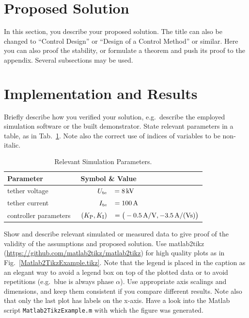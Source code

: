 \documentclass[journal]{IEEEtran}
\newcounter{assumption}
\renewcommand{\t}[1]{\text{\normalfont{#1}}} %
\begin{document}
\section{Proposed Solution}

In this section, you describe your proposed solution. The title can also be changed to “Control Design” or “Design of a Control Method” or similar. Here you can also proof the stability, or formulate a theorem and push its proof to the appendix. Several subsections may be used.


\section{Implementation and Results}

Briefly describe how you verified your solution, e.g.\ describe the employed simulation software or the built demonstrator. State relevant parameters in a table, as in Tab.~\ref{SimulationParameters}. Note also the correct use of indices of variables to be non-italic.

\begin{table}[h!]
		\setlength{\tabcolsep}{1pt}
		\centering
		\caption{Relevant Simulation Parameters.}
		\label{SimulationParameters}
		\begin{tabular}{lrl}
				\\\hline
								\textbf{Parameter}
						&
								\multicolumn{2}{l}{\textbf{Symbol \& Value}}
				\\\hline
								tether voltage
						&
								$U_\t{te}$
						&
								$= \unit[8]{kV}$
				\\
								tether current
						&
								$I_\t{te}$
						&
								$= \unit[100]{A}$
				\\
								controller parameters \,
						&
								$(K_\t{P}, K_\t{I})$
						&
								$= \big(\unit[-0.5]{A/V}, \unit[-3.5]{A/(Vs)}\big)$
				\\\hline
		\end{tabular}
\end{table}

Show and describe relevant simulated or measured data to give proof of the validity of the assumptions and proposed solution. Use matlab2tikz (\url{https://github.com/matlab2tikz/matlab2tikz}) for high quality plots as in Fig.~\ref{Matlab2TikzExample.tikz}. Note that the legend is placed in the caption as an elegant way to avoid a legend box on top of the plotted data or to avoid repetitions (e.g.\ blue is always phase $\alpha$). Use appropriate axis scalings and dimensions, and keep them consistent if you compare different results. Note also that only the last plot has labels on the x-axis. Have a look into the Matlab script \texttt{Matlab2TikzExample.m} with which the figure was generated.
\end{document}
